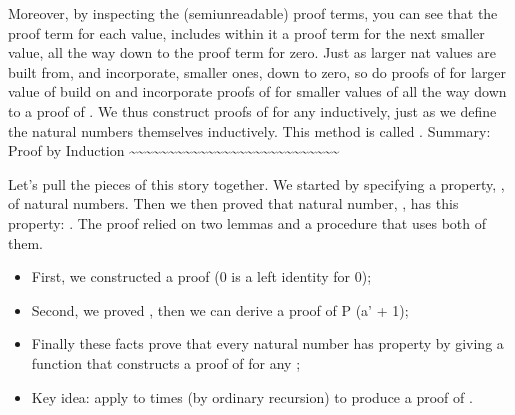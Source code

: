 \documentclass[letterpaper,10pt,english]{sphinxmanual}
\begin{document}
\sphinxAtStartPar
Moreover, by inspecting the (semi\sphinxhyphen{}unreadable) proof
terms, you can see that the proof term for each value,
 includes within it a proof term for the next smaller
value, all the way down to the proof term for zero. Just
as larger nat values are built from, and incorporate,
smaller ones, down to zero, so do proofs of  for
larger value of  build on and incorporate proofs of
 for smaller values of  all the way down to
a proof of . We thus construct proofs of  for
any  inductively, just as we define the natural numbers
themselves inductively. This method is called .
Summary: Proof by Induction
\textasciitilde{}\textasciitilde{}\textasciitilde{}\textasciitilde{}\textasciitilde{}\textasciitilde{}\textasciitilde{}\textasciitilde{}\textasciitilde{}\textasciitilde{}\textasciitilde{}\textasciitilde{}\textasciitilde{}\textasciitilde{}\textasciitilde{}\textasciitilde{}\textasciitilde{}\textasciitilde{}\textasciitilde{}\textasciitilde{}\textasciitilde{}\textasciitilde{}\textasciitilde{}\textasciitilde{}\textasciitilde{}\textasciitilde{}\textasciitilde{}

\sphinxAtStartPar
Let’s pull the pieces of this story together. We started by
specifying a property, , of natural numbers.
Then we then proved that  natural number, , has this
property: . The proof relied on two lemmas and
a procedure that uses both of them.
\begin{itemize}
\item {} 
\sphinxAtStartPar
First, we constructed a proof  (0 is a left identity for 0);

\item {} 
\sphinxAtStartPar
Second, we proved , then we can derive a proof of P (a’ + 1);

\item {} 
\sphinxAtStartPar
Finally these facts prove that every natural number  has property  by giving a function that constructs a proof of  for any ;

\item {} 
\sphinxAtStartPar
Key idea: apply  to  times (by ordinary recursion) to produce a proof of .

\end{itemize}
\end{document}
